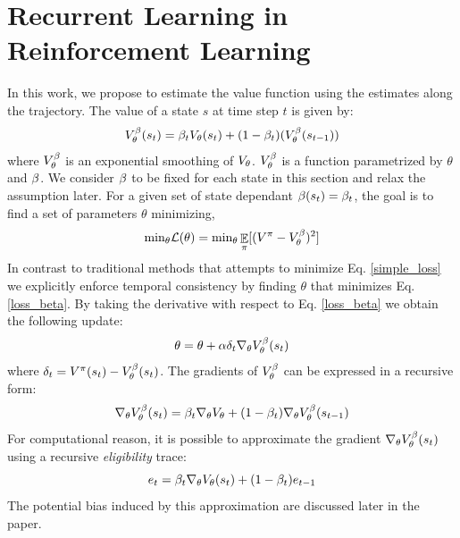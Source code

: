 \section{Recurrent Learning in Reinforcement Learning}
\label{RLRL}
In this work, we propose to estimate the value function using the estimates along the trajectory. The value of a state $s$ at time step $t$ is given by:
\begin{equation}
\label{value}
\begin{split}
    V^{\beta}_{\theta}(s_t) &= \beta_t V_{\theta}(s_t) + (1 - \beta_t) (V^{\beta}_{\theta}(s_{t-1})) \\ 
\end{split}
\end{equation}
where $V^{\beta}_{\theta}$ is an exponential smoothing of $V_{\theta}$. $V^{\beta}_{\theta}$ is a function parametrized by $\theta$ and $\beta$. We consider $\beta$ to be fixed for each state in this section and relax the assumption later. For a given set of state dependant $\beta(s_t) = \beta_t$, the goal is to find a set of parameters $\theta$ minimizing,
\begin{equation}\label{loss_beta}
    \text{min}_{\theta} \mathcal{L}(\theta) = \text{min}_{\theta} \mathop{\mathbb{E}}_{\pi} [(V^{\pi} - V^{\beta}_{\theta})^2]
\end{equation}
In contrast to traditional methods that attempts to minimize Eq. \ref{simple_loss} we explicitly enforce temporal consistency by finding $\theta$ that minimizes Eq. \ref{loss_beta}.
By taking the derivative with respect to Eq. \ref{loss_beta} we obtain the following update:
\begin{equation}
\begin{split}
    \theta &= \theta + \alpha \delta_t  \nabla_{\theta} V^{\beta}_{\theta} (s_t) \\
\end{split}
\end{equation}
where $\delta_t = V^{\pi}(s_t) - V^{\beta}_{\theta}(s_t)$.
 The gradients of $V^{\beta}_{\theta}$ can be expressed in a recursive form:
\begin{equation}
    \nabla_{\theta} V^{\beta}_{\theta} (s_t) = \beta_t \nabla_{\theta} V_{\theta} + (1-\beta_t) \nabla_{\theta} V^{\beta}_{\theta} (s_{t-1})
\end{equation}
For computational reason, it is possible to approximate the gradient $\nabla_{\theta}V^{\beta}_{\theta} (s_{t})$ using a recursive \emph{eligibility} trace:
\begin{equation}
\label{trace}
    e_t = \beta_t \nabla_{\theta} V_{\theta} (s_t) + (1-\beta_t) e_{t-1}
\end{equation} 
The potential bias induced by this approximation are discussed later in the paper.
